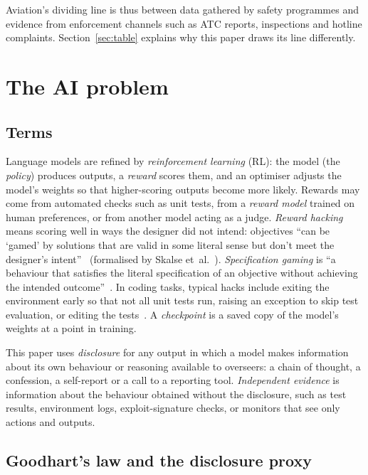 \documentclass[review,12pt]{elsarticle}
\begin{document}
Aviation's dividing line is thus between data gathered by safety programmes and evidence from enforcement channels such as ATC reports, inspections and hotline complaints. Section~\ref{sec:table} explains why this paper draws its line differently.

\section{The AI problem}\label{sec:ai}

\subsection{Terms}\label{sec:terms}

Language models are refined by \emph{reinforcement learning} (RL): the model (the \emph{policy}) produces outputs, a \emph{reward} scores them, and an optimiser adjusts the model's weights so that higher-scoring outputs become more likely. Rewards may come from automated checks such as unit tests, from a \emph{reward model} trained on human preferences, or from another model acting as a judge. \emph{Reward hacking} means scoring well in ways the designer did not intend: objectives ``can be `gamed' by solutions that are valid in some literal sense but don't meet the designer's intent''~\cite[Sec.~4]{amodei2016} (formalised by Skalse et~al.~\cite{skalse2022}). \emph{Specification gaming} is ``a behaviour that satisfies the literal specification of an objective without achieving the intended outcome''~\cite{krakovna2020}. In coding tasks, typical hacks include exiting the environment early so that not all unit tests run, raising an exception to skip test evaluation, or editing the tests~\cite[Secs.~2.1, 3.1]{baker2025}. A \emph{checkpoint} is a saved copy of the model's weights at a point in training.

This paper uses \emph{disclosure} for any output in which a model makes information about its own behaviour or reasoning available to overseers: a chain of thought, a confession, a self-report or a call to a reporting tool. \emph{Independent evidence} is information about the behaviour obtained without the disclosure, such as test results, environment logs, exploit-signature checks, or monitors that see only actions and outputs.

\subsection{Goodhart's law and the disclosure proxy}\label{sec:goodhart}
\end{document}
